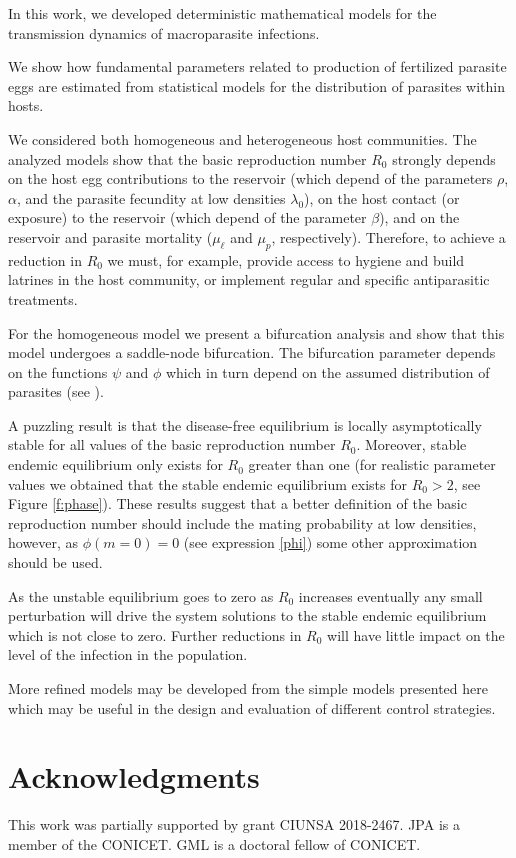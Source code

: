 \documentclass[eng]{MMSB-class-eng}
\begin{document}
{\color{red}

In this work, we developed deterministic mathematical models for the transmission dynamics of macroparasite infections. 

We show how fundamental parameters related to production of fertilized parasite eggs are estimated from statistical models for the distribution of
parasites within hosts.	

We considered both homogeneous and heterogeneous host communities. 
The analyzed models show that the basic reproduction number $R_0$ strongly depends on 
the host egg contributions to the reservoir (which depend of the parameters $\rho$, $\alpha$, and the parasite fecundity at low densities $\lambda_0 $), 
on the host contact (or exposure) to the reservoir (which depend of the parameter $\beta$),  
and on the reservoir and parasite mortality ($\mu_{\ell}$ and $\mu_p$, respectively). 
Therefore, to achieve a reduction in $R_0$ we must, for example, provide access to hygiene and build latrines in the host community, or implement regular and specific antiparasitic treatments.

For the homogeneous model we present a bifurcation analysis and show that this model undergoes a saddle-node bifurcation.
The bifurcation parameter depends on the functions $\psi$ and $\phi$ which in turn depend on the assumed
distribution of parasites (see \citet{lopez2022general}).

{\color{red}
A puzzling result is that the disease-free equilibrium is locally asymptotically  stable for all values of the basic reproduction number $R_0$.  Moreover, stable endemic equilibrium only exists for $R_0$ greater than one (for realistic parameter values we obtained that the stable endemic equilibrium exists for  $R_0>2$,  see Figure \ref{f:phase}). These results suggest that a better definition of the basic reproduction number should include the mating  probability at low densities, however, as  $\phi(m=0)=0$ (see expression \eqref{phi})  some other approximation should be used. 

As the unstable equilibrium goes to zero as $R_0$ increases eventually any small perturbation will drive the system solutions to the stable endemic equilibrium which is not close to zero. Further reductions in $R_0$ will have little impact on the level of the infection in the population. 

}

More refined models may be developed from the simple models presented here which may be useful in the design and evaluation of different control strategies. 

}
\section{Acknowledgments}
This work was partially supported by grant CIUNSA 2018-2467. JPA is a member of the CONICET. GML is a doctoral fellow of CONICET.


\end{document}
